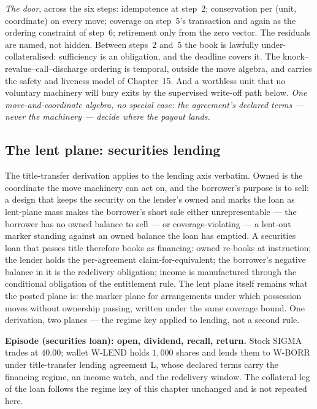 \documentclass[11pt,a4paper]{article}
\begin{document}
\emph{The door}, across the six steps: idempotence at step~2; conservation per
(unit, coordinate) on every move; coverage on step~5's transaction and again
as the ordering constraint of step~6; retirement only from the zero vector.
The residuals are named, not hidden. Between steps~2 and~5 the book is
lawfully under-collateralised: sufficiency is an obligation, and the deadline
covers it. The knock--revalue--call--discharge ordering is temporal, outside
the move algebra, and carries the safety and liveness model of Chapter~15.
And a worthless unit that no voluntary machinery will bury exits by the
supervised write-off path below.
\emph{One move-and-coordinate algebra, no special case: the agreement's
declared terms --- never the machinery --- decide where the payout lands.}

\subsection{The lent plane: securities lending}

The title-transfer derivation applies to the lending axis verbatim. Owned is
the coordinate the move machinery can act on, and the borrower's purpose is to
sell: a design that keeps the security on the lender's owned and marks the
loan as lent-plane mass makes the borrower's short sale either unrepresentable
--- the borrower has no owned balance to sell --- or coverage-violating ---
a lent-out marker standing against an owned balance the loan has emptied. A
securities loan that passes title therefore books as financing: owned re-books
at instruction; the lender holds the per-agreement claim-for-equivalent; the
borrower's negative balance in it is the redelivery obligation; income is
manufactured through the conditional obligation of the entitlement rule. The
lent plane itself remains what the posted plane is: the marker plane for
arrangements under which possession moves without ownership passing, written
under the same coverage bound. One derivation, two planes --- the regime key
applied to lending, not a second rule.

\medskip\noindent\textbf{Episode (securities loan): open, dividend, recall,
return.} Stock SIGMA trades at $40.00$; wallet W-LEND holds $1{,}000$ shares
and lends them to W-BORR under title-transfer lending agreement L, whose
declared terms carry the financing regime, an income watch, and the redelivery
window. The collateral leg of the loan follows the regime key of this chapter
unchanged and is not repeated here.
\end{document}
